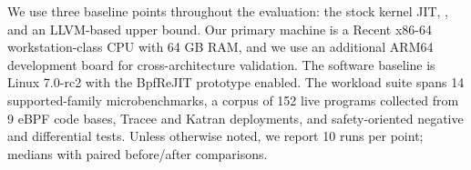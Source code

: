 We use three baseline points throughout the evaluation: the stock kernel JIT,
\tool, and an LLVM-based upper bound. Our primary machine is a
Recent x86-64 workstation-class CPU with 64 GB RAM, and we use an additional ARM64 development board for cross-architecture validation. The software baseline
is Linux 7.0-rc2 with the BpfReJIT prototype enabled. The workload suite spans 14 supported-family microbenchmarks, a corpus of 152 live programs collected from 9 eBPF code bases,
Tracee and Katran deployments, and safety-oriented negative and differential tests.
Unless otherwise noted, we report 10 runs per point; medians with paired before/after comparisons.
